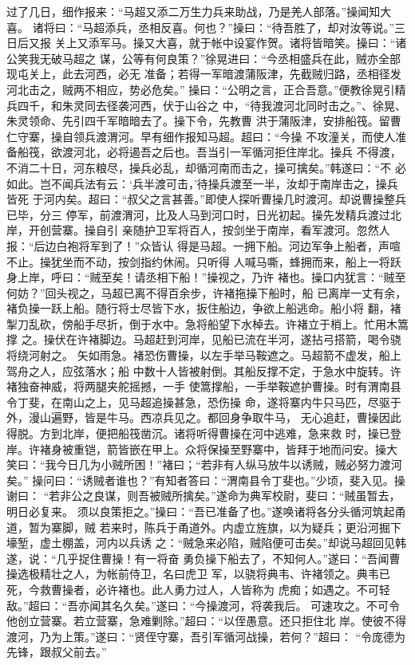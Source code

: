 过了几日，细作报来：“马超又添二万生力兵来助战，乃是羌人部落。”操闻知大喜。
诸将曰：“马超添兵，丞相反喜。何也？”操曰：“待吾胜了，却对汝等说。”三日后又报
关上又添军马。操又大喜，就于帐中设宴作贺。诸将皆暗笑。操曰：“诸公笑我无破马超之
谋，公等有何良策？”徐晃进曰：“今丞相盛兵在此，贼亦全部现屯关上，此去河西，必无
准备；若得一军暗渡蒲阪津，先截贼归路，丞相径发河北击之，贼两不相应，势必危矣。”
操曰：“公明之言，正合吾意。”便教徐晃引精兵四千，和朱灵同去径袭河西，伏于山谷之
中，“待我渡河北同时击之。”、徐晃、朱灵领命、先引四千军暗暗去了。操下令，先教曹
洪于蒲阪津，安排船筏。留曹仁守寨，操自领兵渡渭河。早有细作报知马超。超曰：“今操
不攻潼关，而使人准备船筏，欲渡河北，必将遏吾之后也。吾当引一军循河拒住岸北。操兵
不得渡，不消二十日，河东粮尽，操兵必乱，却循河南而击之，操可擒矣。”韩遂曰：“不
必如此。岂不闻兵法有云：‘兵半渡可击，’待操兵渡至一半，汝却于南岸击之，操兵皆死
于河内矣。超曰：“叔父之言甚善。”即使人探听曹操几时渡河。却说曹操整兵已毕，分三
停军，前渡渭河，比及人马到河口时，日光初起。操先发精兵渡过北岸，开创营寨。操自引
亲随护卫军将百人，按剑坐于南岸，看军渡河。忽然人报：“后边白袍将军到了！”众皆认
得是马超。一拥下船。河边军争上船者，声喧不止。操犹坐而不动，按剑指约休闹。只听得
人喊马嘶，蜂拥而来，船上一将跃身上岸，呼曰：“贼至矣！请丞相下船！”操视之，乃许
褚也。操口内犹言：“贼至何妨？”回头视之，马超已离不得百余步，许褚拖操下船时，船
已离岸一丈有余，褚负操一跃上船。随行将士尽皆下水，扳住船边，争欲上船逃命。船小将
翻，褚掣刀乱砍，傍船手尽折，倒于水中。急将船望下水棹去。许褚立于梢上。忙用木篙撑
之。操伏在许褚脚边。马超赶到河岸，见船已流在半河，遂拈弓搭箭，喝令骁将绕河射之。
矢如雨急。褚恐伤曹操，以左手举马鞍遮之。马超箭不虚发，船上驾舟之人，应弦落水；船
中数十人皆被射倒。其船反撑不定，于急水中旋转。许褚独奋神威，将两腿夹舵摇撼，一手
使篙撑船，一手举鞍遮护曹操。时有渭南县令丁斐，在南山之上，见马超追操甚急，恐伤操
命，遂将寨内牛只马匹，尽驱于外，漫山遍野，皆是牛马。西凉兵见之。都回身争取牛马，
无心追赶，曹操因此得脱。方到北岸，便把船筏凿沉。诸将听得曹操在河中逃难，急来救
时，操已登岸。许褚身被重铠，箭皆嵌在甲上。众将保操至野寨中，皆拜于地而问安。操大
笑曰：“我今日几为小贼所困！”褚曰；“若非有人纵马放牛以诱贼，贼必努力渡河矣。”
操问曰：“诱贼者谁也？”有知者答曰：“渭南县令丁斐也。”少顷，斐入见。操谢曰：
“若非公之良谋，则吾被贼所擒矣。”遂命为典军校尉，斐曰：“贼虽暂去，明日必复来。
须以良策拒之。”操曰：“吾已准备了也。”遂唤诸将各分头循河筑起甬道，暂为寨脚，贼
若来时，陈兵于甬道外。内虚立旌旗，以为疑兵；更沿河掘下壕堑，虚土棚盖，河内以兵诱
之：“贼急来必陷，贼陷便可击矣。”却说马超回见韩遂，说：“几乎捉住曹操！有一将奋
勇负操下船去了，不知何人。”遂曰：“吾闻曹操选极精壮之人，为帐前侍卫，名曰虎卫
军，以骁将典韦、许褚领之。典韦已死，今救曹操者，必许褚也。此人勇力过人，人皆称为
虎痴；如遇之。不可轻敌。”超曰：“吾亦闻其名久矣。”遂曰：“今操渡河，将袭我后。
可速攻之。不可令他创立营寨。若立营寨，急难剿除。”超曰：“以侄愚意。还只拒住北
岸。使彼不得渡河，乃为上策。”遂曰：“贤侄守寨，吾引军循河战操，若何？”超曰：
“令庞德为先锋，跟叔父前去。”

